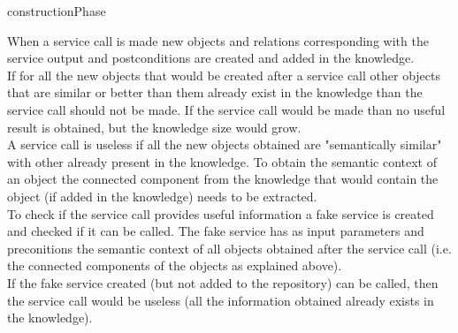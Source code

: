 \documentclass[12pt]{article}
\theoremstyle{definition}
\begin{document}
	\begin{algorithm}[H]
		\caption{constructionPhase}
	\end{algorithm}
	When a service call is made new objects and relations corresponding with the service output and postconditions are created and added in the knowledge. \\
	If for all the new objects that would be created after a service call other objects that are similar or better than them already exist in the knowledge than the service call should not be made. If the service call would be made than no useful result is obtained, but the knowledge size would grow. \\
	A service call is useless if all the new objects obtained are "semantically similar" with other already present in the knowledge. To obtain the semantic context of an object the connected component from the knowledge that would contain the object (if added in the knowledge) needs to be extracted. \\
	To check if the service call provides useful information a fake service is created and checked if it can be called. The fake service has as input parameters and preconitions the semantic context of all objects obtained after the service call (i.e. the connected components of the objects as explained above). \\
	If the fake service created (but not added to the repository) can be called, then the service call would be useless (all the information obtained already exists in the knowledge).
	
\end{document}
